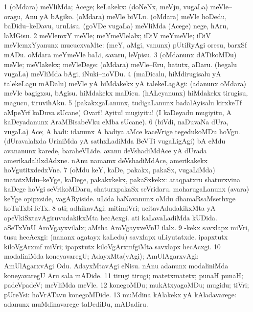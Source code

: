 \bentry
{}
\gl{\kirxvi}
\bmng
\bnum
\num{1} (oMdara) meVliMda; Acege; keLakekx:  (doNeNx, meVju, \mo vugaLa) meVle--oragu, Anu yA bAgiko.  (oMdara) meVle biVLu.  (oMdara) meVle hoDedu, baDidu--keDavu, uruLisu.  (goVDe \mo vugaLa) meVliMda (Acege) nege, hAru, laMGisu. 
\num{2} meVlemxY meVle; meYmeVlelalx; iDiV meYmeVle; iDiV meVlemxYyanunx mucucxvaMte:  (meY, aMgi, \mo vanunx) pUtiRyAgi oresu, barxSf mADu.  oMdara meYmeVle baLi, savaru, leVpisu. 
\num{3} (oMdanunx dATikoMDu) meVle; meVlakekx; meVleDege:  (oMdara) meVle--Eru, hatutx, aDaru.  (hegalu \mo vugaLa) meVliMda bAgi, iNuki--noVDu. 
\num{4} (maDicalu, hiMdirugisalu yA talekeLagu mADalu) meVle yA hiMdakekx yA talekeLagAgi:  (adanunx oMdara) meVle bagigxsu, bAgisu.  hiMdakekx maDicu.  (hALeyanunx) hiMdakekx tirugisu, magucu, tiruvihAku. 
\num{5} (pakakxgaLanunx, tudigaLanunx badalAyisalu kirxkeTf aMpeYrf koDuva sUcane) Ovarf! Ayitu! mugiyitu! (I kaDeyadu mugiyitu, A kaDeyadanunx AraMBisabeVku eMba sUcane). 
\num{6} (biVdi, naDuvaNa dUra, \mo vugaLa) Ace; A badi:  idanunx A badiya aMce kaceVrige tegedukoMDu hoVgu.  (dUravalalxda UriniMda yA sathxLadiMda BeVTi \mo vugaLigAgi) bA eMdu avananunx karede, baraheVLide.  avanu deVshadiMdAce yA dUrada amerikadalilxdAdxne.  nAnu namamx deVshadiMdAce, amerikakekx hoVgutitxdedxVne. 
\num{7} (oMdu keY, kaDe, pakakx, pakaSx, \mo vugaLiMda) matotxMdu--keYge, kaDege, pakakxkekx, pakaSxkekx:  ataqpatxru shaturxvina kaDege hoVgi seVrikoMDaru, shaturxpakaSx seVridaru.  moharugaLanunx (avara) keYge opipxside, vagARyiside.  uLida haNavanunx oMdu dhamaRsaMsethxge koTuTxbiTeTx. 
\num{8} ati; adhikavAgi; mitimiVri; ucitavAdudakikxMta yA apeVkiSxtavAgiruvudakikxMta hecAcxgi.  ati kaLavaLadiMda kUDida.  aSeTxVnU AroVgayxvilalx; aMtha AroVgayxveVnU ilalx. 
\num{9} -kekx savxlapx miVri, tusu hecAcxgi:  (nananx agatayx kaLedu) savxlapx uLiyutatxde.   ipapxtutx kiloVgArxmf miVri; ipapxtutx kiloVgArxmfgiMta savxlapx hecAcxgi. 
\num{10} modaliniMda koneyavaregU; AdayxMta(vAgi); AmUlAgarxvAgi:  AmUlAgarxvAgi Odu.  AdayxMtavAgi eNisu.  nAnu adanunx modaliniMda koneyavaregU Aru sala mADide. 
\num{11} tirugi tirugi; matetxmatetx; punaH punaH; padeVpadeV; meVliMda meVle. 
\num{12} konegoMDu; mukAtxyagoMDu; mugidu; tiVri; pUreYsi:  hoVrATavu konegoMDide. 
\num{13} muMdina kAlakekx yA kAladavarege:  adanunx muMdinavarege taDediDu, mADadiru. 
\enum
\emng

